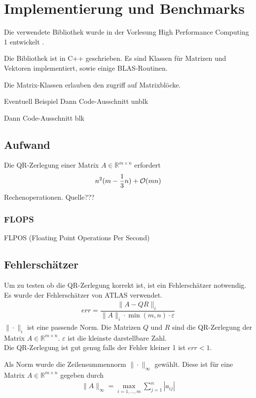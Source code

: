 \chapter{Implementierung und Benchmarks}
Die verwendete Bibliothek wurde in der Vorlesung High Performance Computing 1 entwickelt \cite{HPC1}.

Die Bibliothek ist in C++ geschrieben. Es sind Klassen für Matrizen und Vektoren implementiert, sowie einige BLAS-Routinen.

Die Matrix-Klassen erlauben den zugriff auf Matrixblöcke. 



Eventuell Beispiel
Dann Code-Ausschnitt unblk

Dann Code-Ausschnitt blk


\section{Aufwand}

Die QR-Zerlegung einer Matrix $A \in \mathbb{R}^{m \times n}$  erfordert
\begin{align*}
	n^2(m-\frac{1}{3} n) + {\cal O}(mn)
\end{align*}
Rechenoperationen. Quelle???

\subsection{FLOPS}
FLPOS (Floating Point Operations Per Second) 

\section{Fehlerschätzer}

Um zu testen ob die QR-Zerlegung korrekt ist, ist ein Fehlerschätzer notwendig.
Es wurde der Fehlerschätzer von ATLAS\cite{atlas} verwendet.
\begin{align}
	err = \dfrac{\|A - QR\|_i}{\|A\|_i \cdot \min(m,n) \cdot \varepsilon}
\end{align}
$\|\cdot\|_i$ ist eine passende Norm.
Die Matrizen $Q$ und $R$ sind die QR-Zerlegung der Matrix $A \in \mathbb{R}^{m \times n}$.
$\varepsilon$ ist die kleinste darstellbare Zahl.\\
Die QR-Zerlegung ist gut genug falls der Fehler kleiner 1 ist $ err < 1 $.

Als Norm wurde die Zeilensummennorm $\|\cdot\|_\infty$ gewählt.
Diese ist für eine Matrix $A \in \mathbb{R}^{m\times n}$ gegeben durch
\begin{align*}
	\|A\|_\infty = \max_{i=1,...,m} \sum_{j=1}^{n} |a_{ij}|
\end{align*}


